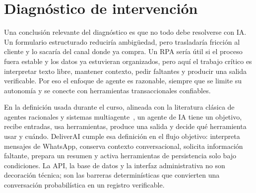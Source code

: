 \section{Diagnóstico de intervención}

Una conclusión relevante del diagnóstico es que no todo debe resolverse con IA. Un formulario estructurado reduciría ambigüedad, pero trasladaría fricción al cliente y lo sacaría del canal donde ya compra. Un RPA sería útil si el proceso fuera estable y los datos ya estuvieran organizados, pero aquí el trabajo crítico es interpretar texto libre, mantener contexto, pedir faltantes y producir una salida verificable. Por eso el enfoque de agente es razonable, siempre que se limite su autonomía y se conecte con herramientas transaccionales confiables.

En la definición usada durante el curso, alineada con la literatura clásica de agentes racionales y sistemas multiagente~\cite{russell2020,wooldridge2009}, un agente de IA tiene un objetivo, recibe entradas, usa herramientas, produce una salida y decide qué herramienta usar y cuándo. DeliverAI cumple esa definición en el flujo objetivo: interpreta mensajes de WhatsApp, conserva contexto conversacional, solicita información faltante, prepara un resumen y activa herramientas de persistencia solo bajo condiciones. La API, la base de datos y la interfaz administrativa no son decoración técnica; son las barreras determinísticas que convierten una conversación probabilística en un registro verificable.
